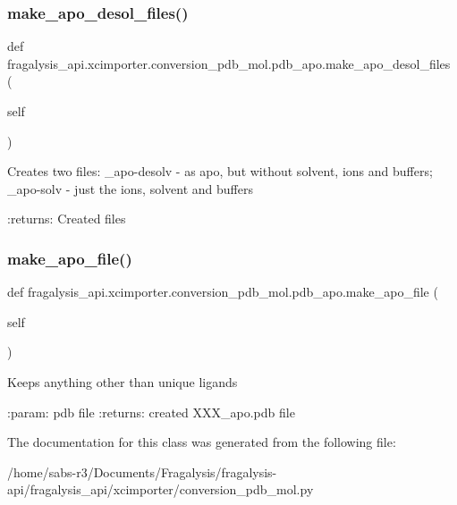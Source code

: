 \subsubsection{\texorpdfstring{make\+\_\+apo\+\_\+desol\+\_\+files()}{make\_apo\_desol\_files()}}
{\footnotesize\ttfamily def fragalysis\+\_\+api.\+xcimporter.\+conversion\+\_\+pdb\+\_\+mol.\+pdb\+\_\+apo.\+make\+\_\+apo\+\_\+desol\+\_\+files (\begin{DoxyParamCaption}\item[{}]{self }\end{DoxyParamCaption})}

\begin{DoxyVerb}Creates two files:
_apo-desolv - as apo, but without solvent, ions and buffers;
_apo-solv - just the ions, solvent and buffers

:returns: Created files
\end{DoxyVerb}
 \mbox{\label{classfragalysis__api_1_1xcimporter_1_1conversion__pdb__mol_1_1pdb__apo_a08488b34eeb131d43d3139ecbbdb78fb}} 
\subsubsection{\texorpdfstring{make\+\_\+apo\+\_\+file()}{make\_apo\_file()}}
{\footnotesize\ttfamily def fragalysis\+\_\+api.\+xcimporter.\+conversion\+\_\+pdb\+\_\+mol.\+pdb\+\_\+apo.\+make\+\_\+apo\+\_\+file (\begin{DoxyParamCaption}\item[{}]{self }\end{DoxyParamCaption})}

\begin{DoxyVerb}Keeps anything other than unique ligands

:param: pdb file
:returns: created XXX_apo.pdb file
\end{DoxyVerb}
 

The documentation for this class was generated from the following file\+:\begin{DoxyCompactItemize}
\item 
/home/sabs-\/r3/\+Documents/\+Fragalysis/fragalysis-\/api/fragalysis\+\_\+api/xcimporter/conversion\+\_\+pdb\+\_\+mol.\+py\end{DoxyCompactItemize}

